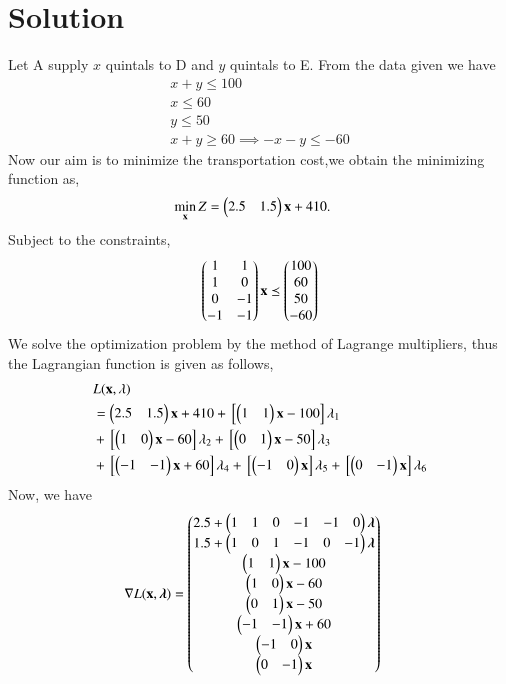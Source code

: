 \documentclass[journal,12pt,twocolumn]{IEEEtran}
\begin{document}
\section{Solution}
Let A supply $x$ quintals to D and $y$ quintals to E.
From the data given we have 
\begin{align}
    x+y\leq100 \\
    x\leq60 \\ 
    y\leq50 \\
    x+y\geq60 \implies -x-y\leq-60
\end{align}
Now our aim is to minimize the transportation cost,we obtain the minimizing function as,
\begin{align}
    \min_{\mathbf{x}} Z &= \begin{pmatrix}2.5 & 1.5\end{pmatrix}\mathbf{x}+410.
\end{align}
Subject to the constraints,
\begin{align}
    \begin{pmatrix}1 & 1 \\ 1 & 0 \\ 0 & -1 \\ -1 & -1\end{pmatrix}\mathbf{x} \preceq \begin{pmatrix}100 \\ 60 \\ 50 \\ -60\end{pmatrix}
\end{align}
We solve the optimization problem by the method of Lagrange multipliers, thus the Lagrangian function is given as follows,
\begin{equation}
  \begin{aligned}
     &L(\mathbf{x},\lambda) \\ &= \begin{pmatrix}2.5 & 1.5\end{pmatrix}\mathbf{x}+410+{}\left[\begin{pmatrix}1 & 1\end{pmatrix}\mathbf{x}-100\right]\lambda_1 \\ &+ {}\left[\begin{pmatrix}1 & 0\end{pmatrix}\mathbf{x}-60\right]\lambda_2 +{}\left[\begin{pmatrix}0 & 1\end{pmatrix}\mathbf{x}-50\right]\lambda_3 \\ &+ {}\left[\begin{pmatrix}-1 & -1\end{pmatrix}\mathbf{x}+60\right]\lambda_4 +{}\left[\begin{pmatrix}-1 & 0\end{pmatrix}\mathbf{x}\right]\lambda_5+{}\left[\begin{pmatrix}0 & -1\end{pmatrix}\mathbf{x}\right]\lambda_6
\end{aligned}  
\end{equation}
Now, we have 
\begin{align}
    \nabla L(\mathbf{x},\boldsymbol{\lambda}) &= \begin{pmatrix}2.5+ \begin{pmatrix}1 & 1 & 0 & -1 & -1 & 0\end{pmatrix}\boldsymbol{\lambda}\\ 1.5+\begin{pmatrix}1 & 0 & 1 & -1 & 0 & -1\end{pmatrix}\boldsymbol{\lambda} \\ \begin{pmatrix}1 & 1\end{pmatrix}\mathbf{x}-100 \\ \begin{pmatrix}1 & 0\end{pmatrix}\mathbf{x}-60 \\ \begin{pmatrix}0 & 1\end{pmatrix}\mathbf{x}-50 \\ \begin{pmatrix}-1 & -1\end{pmatrix}\mathbf{x}+60 \\ \begin{pmatrix}-1 & 0\end{pmatrix}\mathbf{x} \\ \begin{pmatrix}0 & -1\end{pmatrix}\mathbf{x}\end{pmatrix}
\end{align}
\end{document}
